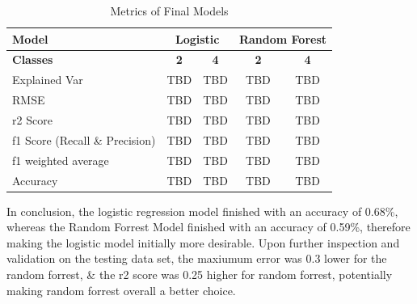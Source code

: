 \documentclass[11pt, a4paper]{article}
\begin{document}
\begin{multicols}{2}
\begin{table}[H]
	\centering
	\renewcommand{\arraystretch}{1.2}
	\begin{tabular}{|p{3.4cm}|c|c|c|c|}
	  \hline
	  \textbf{Model} & \multicolumn{2}{c|}{\textbf{Logistic}} & \multicolumn{2}{c|}{\textbf{Random Forest}}\\
	  \cline{2-5}\hline
	  \textbf{Classes}& \textbf{2} & \textbf{4} & \textbf{2} & \textbf{4}\\
	  \hline
	  Explained Var & TBD & TBD & TBD & TBD\\ \hline
	  RMSE & TBD & TBD & TBD & TBD \\ \hline
	  r2 Score & TBD & TBD & TBD & TBD  \\ \hline
	  f1 Score \newline (Recall \& Precision) & TBD & TBD & TBD & TBD  \\ \hline
	  f1 weighted average & TBD & TBD & TBD & TBD  \\ \hline
	  Accuracy & TBD & TBD & TBD & TBD  \\ \hline
	\end{tabular}
	\caption{Metrics of Final Models}
	\label{table:metrics}
  \end{table}

In conclusion, the logistic regression model finished with an accuracy of 0.68\%, whereas the Random Forrest Model finished with an accuracy of 0.59\%, therefore making the logistic model initially more desirable.
Upon further inspection and validation on the testing data set, the maxiumum error was 0.3 lower for the random forrest, \& the r2 score was 0.25 higher for random forrest, potentially making random forrest overall a better choice.

\end{multicols}
\end{document}
